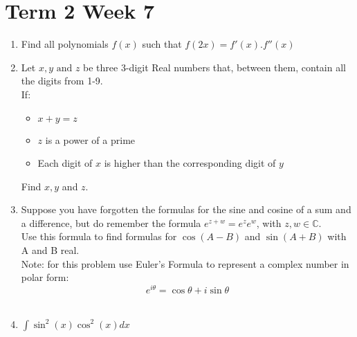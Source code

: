 \documentclass[../main.tex]{subfiles}
\begin{document}
\section*{Term 2 Week 7}
\begin{enumerate}
    \item 
    Find all polynomials \(f(x)\) such that \(f(2x)=f'(x).f''(x)\)\\

    \item 
    Let \(x, y \text{ and } z\) be three 3-digit Real numbers that, between them, contain all the digits from 1-9.\\
    If:
    \begin{itemize}
        \item 
            \(x+y=z\)
        \item 
            \(z\) is a power of a prime
        \item 
            Each digit of \(x\) is higher than the corresponding digit of \(y\)
    \end{itemize}
    Find \(x, y\) and \(z\).\\

    \item
    Suppose you have forgotten the formulas for the sine and cosine of a sum and a difference, but do remember the formula \(e^{z+w}=e^z e^w\), with \(z, w \in \mathbb{C} \).\\
    Use this formula to find formulas for \(\cos{(A-B)}\) and \(\sin{(A+B)}\) with A and B real.\\

    Note: for this problem use Euler's Formula to represent a complex number in polar form:\\
    \[e^{i\theta}=\cos{\theta}+i\sin{\theta}\]\\

    \item 
    \(\int \sin^2{(x)}\cos^2{(x)} dx\)
    
    \end{enumerate}
\end{document}
